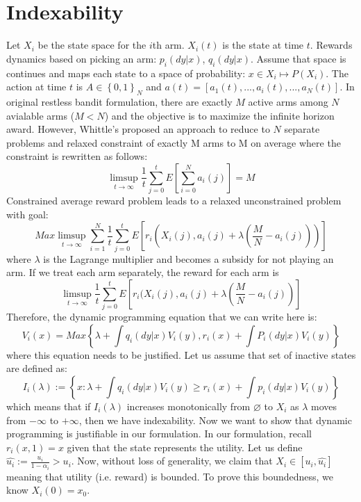 \documentclass[conference]{IEEEtran}
\begin{document}
\section{Indexability}
Let $X_i$ be the state space for the $i$th arm. $X_i(t)$ is the state at time $t$. Rewards dynamics based on picking an arm: $p_i(dy|x)$, $q_i(dy|x)$. Assume that space is continues and maps each state to a space of probability: $x \in X_i \mapsto P(X_i)$. The action at time $t$ is $A \in \left \{ 0, 1\right\}_N$ and $a(t)=\left [ a_1(t), ..., a_i(t), ...,a_N(t)\right ] $. In original restless bandit formulation, there are exactly $M$ active arms among $N$ avialable arms ($M<N$) and the objective is to maximize the infinite horizon award. However, Whittle's proposed an approach to reduce to $N$ separate problems and relaxed constraint of exactly M arms to M on average where the constraint is rewritten as follows:
\begin{equation}
    \limsup_{t\rightarrow\infty}\frac{1}{t} \sum_{j=0}^{t} E \left [\sum_{i=0}^{N} a_i(j) \right] = M
\end{equation}
Constrained average reward problem leads to a relaxed unconstrained problem with goal:
\begin{equation}
    Max \limsup_{t\rightarrow \infty} \sum_{i=1}^{N} \frac{1}{t} \sum_{j=0}^{t} E \left [ r_i(X_i(j), a_i(j) + \lambda(\frac{M}{N}-a_i(j)))\right ]
\end{equation}
where $\lambda$ is the Lagrange multiplier and becomes a subsidy for not playing an arm. If we treat each arm separately, the reward for each arm is 
\begin{equation}
    \limsup_{t \rightarrow \infty} \frac{1}{t} \sum_{j=0}^{t} E\left [ r_i(X_i(j), a_i(j)+ \lambda(\frac{M}{N}-a_i(j))\right]
\end{equation}
Therefore, the dynamic programming equation that we can write here is:
\begin{equation}
    V_i(x) = Max \left \{ \lambda + \int q_i(dy|x)V_i(y), r_i(x) + \int P_i(dy|x)V_i(y)\right \}
\end{equation}
where this equation needs to be justified. Let us assume that set of inactive states are defined as:
\begin{equation}
    I_i(\lambda):= \left \{x: \lambda + \int q_i(dy|x)V_i(y) \geq r_i(x)+ \int p_i(dy|x)V_i(y)\right \}
\end{equation}
which means that if $I_i(\lambda)$ increases monotonically from $\varnothing$ to $X_i$ as $\lambda$ moves from $-\infty$ to $+\infty$, then we have indexability. Now we want to show that dynamic programming is justifiable in our formulation. In our formulation, recall $r_i(x, 1)=x$ given that the state represents the utility. Let us define $\hat{u_i} := \frac{u_i}{1-\alpha_i} > u_i$. Now, without loss of generality, we claim that $X_i \in \left [u_i, \hat{u_i} \right]$ meaning that utility (i.e. reward) is bounded. To prove this boundedness, we know $X_i(0)=x_0$. 
\end{document}
